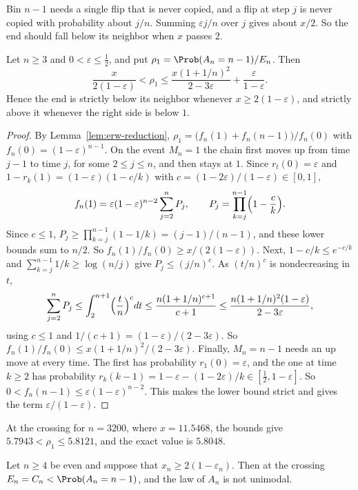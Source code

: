Bin $n-1$ needs a single flip that is never copied, and a flip at step $j$
is never copied with probability about $j/n$. Summing $\varepsilon j/n$ over
$j$ gives about $x/2$. So the end should fall below its neighbor when $x$
passes $2$.

\begin{theorem}\label{thm:dip}
Let $n\ge3$ and $0<\varepsilon\le\frac12$, and put
$\rho_1=\Prob(A_n=n-1)/E_n$. Then
\[
 \frac{x}{2(1-\varepsilon)}<\rho_1\le\frac{x(1+1/n)^2}{2-3\varepsilon}+\frac{\varepsilon}{1-\varepsilon}.
\]
Hence the end is strictly below its neighbor whenever $x\ge2(1-\varepsilon)$,
and strictly above it whenever the right side is below $1$.
\end{theorem}

\begin{proof}
By Lemma~\ref{lem:erw-reduction},
$\rho_1=\bigl(f_n(1)+f_n(n-1)\bigr)/f_n(0)$ with $f_n(0)=(1-\varepsilon)^{n-1}$.
On the event $M_n=1$ the chain first moves up from time $j-1$ to time $j$,
for some $2\le j\le n$, and then stays at $1$. Since $r_t(0)=\varepsilon$ and
$1-r_k(1)=(1-\varepsilon)(1-c/k)$ with
$c=(1-2\varepsilon)/(1-\varepsilon)\in[0,1]$,
\[
 f_n(1)=\varepsilon(1-\varepsilon)^{n-2}\sum_{j=2}^nP_j,\qquad
 P_j=\prod_{k=j}^{n-1}\Bigl(1-\frac ck\Bigr).
\]
Since $c\le1$, $P_j\ge\prod_{k=j}^{n-1}(1-1/k)=(j-1)/(n-1)$, and these
lower bounds sum to $n/2$. So $f_n(1)/f_n(0)\ge x/(2(1-\varepsilon))$. Next,
$1-c/k\le e^{-c/k}$ and $\sum_{k=j}^{n-1}1/k\ge\log(n/j)$ give
$P_j\le(j/n)^c$. As $(t/n)^c$ is nondecreasing in $t$,
\[
 \sum_{j=2}^nP_j\le\int_2^{n+1}\Bigl(\frac tn\Bigr)^c dt
 \le\frac{n(1+1/n)^{c+1}}{c+1}\le\frac{n(1+1/n)^2(1-\varepsilon)}{2-3\varepsilon},
\]
using $c\le1$ and $1/(c+1)=(1-\varepsilon)/(2-3\varepsilon)$. So
$f_n(1)/f_n(0)\le x(1+1/n)^2/(2-3\varepsilon)$. Finally, $M_n=n-1$ needs an
up move at every time. The first has probability $r_1(0)=\varepsilon$, and
the one at time $k\ge2$ has probability
$r_k(k-1)=1-\varepsilon-(1-2\varepsilon)/k\in[\frac12,1-\varepsilon]$. So
$0<f_n(n-1)\le\varepsilon(1-\varepsilon)^{n-2}$. This makes the lower bound
strict and gives the term $\varepsilon/(1-\varepsilon)$.
\end{proof}

At the crossing for $n=3200$, where $x=11.5468$, the bounds give
$5.7943<\rho_1\le5.8121$, and the exact value is $5.8048$.

\begin{corollary}\label{cor:dip}
Let $n\ge4$ be even and suppose that $x_n\ge2(1-\varepsilon_n)$. Then at
the crossing $E_n=C_n<\Prob(A_n=n-1)$, and the law of $A_n$ is not unimodal.
\end{corollary}

